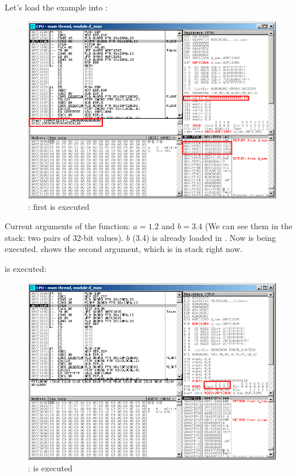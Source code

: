 ﻿\clearpage
{}
\myindex{\olly}

Let's load the example into \olly:

\begin{figure}[H]
\centering
\includegraphics[scale=\FigScale]{patterns/12_FPU/3_comparison/x86/MSVC/olly1_1.png}
\caption{\olly: first \FLD is executed}
\label{fig:FPU_comparison_case1_olly1}
\end{figure}

Current arguments of the function: $a=1.2$ and $b=3.4$ (We can see them in the stack: two pairs of 32-bit values).
$b$ (3.4) is already loaded in .
Now \FCOMP is being executed. 
\olly shows the second \FCOMP argument, which is in stack right now.

\clearpage
\FCOMP is executed:

\begin{figure}[H]
\centering
\includegraphics[scale=\FigScale]{patterns/12_FPU/3_comparison/x86/MSVC/olly1_2.png}
\caption{\olly: \FCOMP is executed}
\label{fig:FPU_comparison_case1_olly2}
\end{figure}

